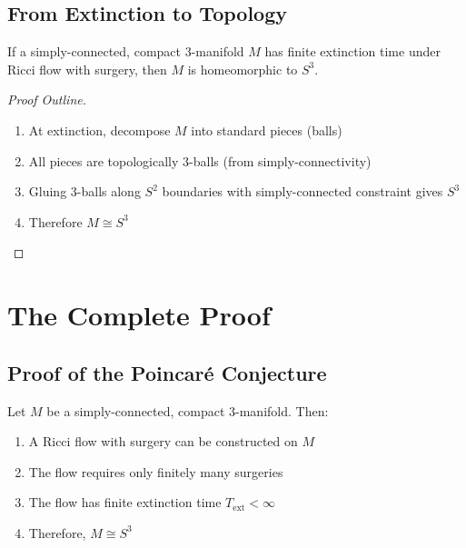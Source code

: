 \section{From Extinction to Topology}

\begin{theorem}
\label{thm:extinction_implies_s3}
If a simply-connected, compact 3-manifold $M$ has finite extinction time under Ricci flow with surgery, then $M$ is homeomorphic to $S^3$.
\end{theorem}

\begin{proof}[Proof Outline]
\begin{enumerate}
\item At extinction, decompose $M$ into standard pieces (balls)
\item All pieces are topologically 3-balls (from simply-connectivity)
\item Gluing 3-balls along $S^2$ boundaries with simply-connected constraint gives $S^3$
\item Therefore $M \cong S^3$
\end{enumerate}
\end{proof}

\chapter{The Complete Proof}
\label{chap:complete_proof}

\section{Proof of the Poincaré Conjecture}

\begin{theorem}
\label{thm:poincare_complete}
Let $M$ be a simply-connected, compact 3-manifold. Then:
\begin{enumerate}
\item A Ricci flow with surgery can be constructed on $M$
\item The flow requires only finitely many surgeries
\item The flow has finite extinction time $T_{\text{ext}} < \infty$
\item Therefore, $M \cong S^3$
\end{enumerate}
\end{theorem}

